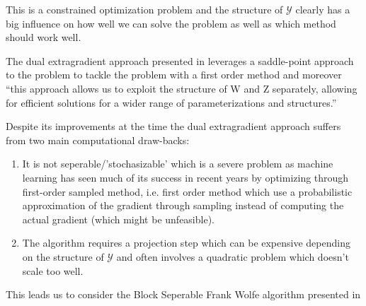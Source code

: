 This is a constrained optimization problem and the structure of $\mathcal Y$
clearly has a big influence on how well we can solve the problem as
well as which method should work well. 

The dual extragradient approach presented in
\citet{taskarStructuredPredictionDual2006} leverages
a saddle-point approach to the problem to tackle the problem
with a first order method and moreover ``this approach
allows us to exploit the structure of W and Z separately, allowing for efficient solutions for a wider
range of parameterizations and structures.''\citep{taskarStructuredPredictionDual2006}

\clearpage
Despite its improvements at the time the dual extragradient approach suffers
from two main computational draw-backs:
\begin{enumerate}
\item It is not seperable/'stochasizable' which is a severe problem as
  machine learning has seen much of its success in recent years by optimizing
  through first-order sampled method, i.e. first order method which
  use a probabilistic approximation of the gradient through sampling instead
  of computing the actual gradient (which might be unfeasible).

\item  The algorithm requires a projection step which can be expensive depending
  on the structure of $\mathcal Y$ and often involves a quadratic problem which
  doesn't scale too well.
\end{enumerate} 
 
This leads us to consider the Block Seperable Frank Wolfe algorithm
presented in \citet{lacoste-julienBlockCoordinateFrankWolfeOptimization2013}




